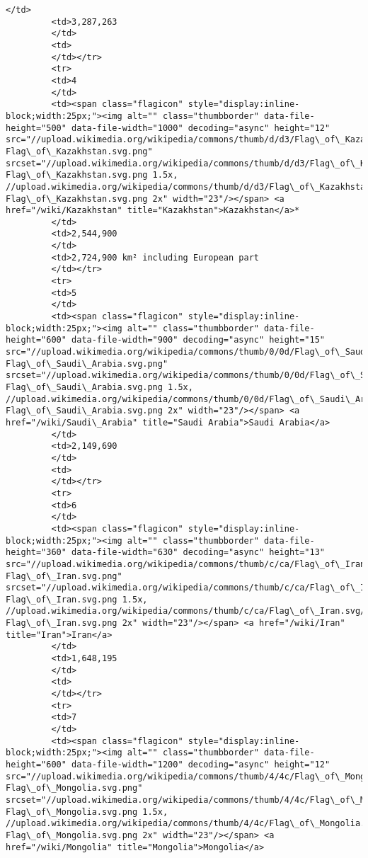 \documentclass[11pt]{article}
\begin{document}
\begin{Verbatim}[commandchars=\\\{\}]
         </td>
         <td>3,287,263
         </td>
         <td>
         </td></tr>
         <tr>
         <td>4
         </td>
         <td><span class="flagicon" style="display:inline-block;width:25px;"><img alt="" class="thumbborder" data-file-height="500" data-file-width="1000" decoding="async" height="12" src="//upload.wikimedia.org/wikipedia/commons/thumb/d/d3/Flag\_of\_Kazakhstan.svg/23px-Flag\_of\_Kazakhstan.svg.png" srcset="//upload.wikimedia.org/wikipedia/commons/thumb/d/d3/Flag\_of\_Kazakhstan.svg/35px-Flag\_of\_Kazakhstan.svg.png 1.5x, //upload.wikimedia.org/wikipedia/commons/thumb/d/d3/Flag\_of\_Kazakhstan.svg/46px-Flag\_of\_Kazakhstan.svg.png 2x" width="23"/></span> <a href="/wiki/Kazakhstan" title="Kazakhstan">Kazakhstan</a>*
         </td>
         <td>2,544,900
         </td>
         <td>2,724,900 km² including European part
         </td></tr>
         <tr>
         <td>5
         </td>
         <td><span class="flagicon" style="display:inline-block;width:25px;"><img alt="" class="thumbborder" data-file-height="600" data-file-width="900" decoding="async" height="15" src="//upload.wikimedia.org/wikipedia/commons/thumb/0/0d/Flag\_of\_Saudi\_Arabia.svg/23px-Flag\_of\_Saudi\_Arabia.svg.png" srcset="//upload.wikimedia.org/wikipedia/commons/thumb/0/0d/Flag\_of\_Saudi\_Arabia.svg/35px-Flag\_of\_Saudi\_Arabia.svg.png 1.5x, //upload.wikimedia.org/wikipedia/commons/thumb/0/0d/Flag\_of\_Saudi\_Arabia.svg/45px-Flag\_of\_Saudi\_Arabia.svg.png 2x" width="23"/></span> <a href="/wiki/Saudi\_Arabia" title="Saudi Arabia">Saudi Arabia</a>
         </td>
         <td>2,149,690
         </td>
         <td>
         </td></tr>
         <tr>
         <td>6
         </td>
         <td><span class="flagicon" style="display:inline-block;width:25px;"><img alt="" class="thumbborder" data-file-height="360" data-file-width="630" decoding="async" height="13" src="//upload.wikimedia.org/wikipedia/commons/thumb/c/ca/Flag\_of\_Iran.svg/23px-Flag\_of\_Iran.svg.png" srcset="//upload.wikimedia.org/wikipedia/commons/thumb/c/ca/Flag\_of\_Iran.svg/35px-Flag\_of\_Iran.svg.png 1.5x, //upload.wikimedia.org/wikipedia/commons/thumb/c/ca/Flag\_of\_Iran.svg/46px-Flag\_of\_Iran.svg.png 2x" width="23"/></span> <a href="/wiki/Iran" title="Iran">Iran</a>
         </td>
         <td>1,648,195
         </td>
         <td>
         </td></tr>
         <tr>
         <td>7
         </td>
         <td><span class="flagicon" style="display:inline-block;width:25px;"><img alt="" class="thumbborder" data-file-height="600" data-file-width="1200" decoding="async" height="12" src="//upload.wikimedia.org/wikipedia/commons/thumb/4/4c/Flag\_of\_Mongolia.svg/23px-Flag\_of\_Mongolia.svg.png" srcset="//upload.wikimedia.org/wikipedia/commons/thumb/4/4c/Flag\_of\_Mongolia.svg/35px-Flag\_of\_Mongolia.svg.png 1.5x, //upload.wikimedia.org/wikipedia/commons/thumb/4/4c/Flag\_of\_Mongolia.svg/46px-Flag\_of\_Mongolia.svg.png 2x" width="23"/></span> <a href="/wiki/Mongolia" title="Mongolia">Mongolia</a>

\end{Verbatim}
\end{document}
